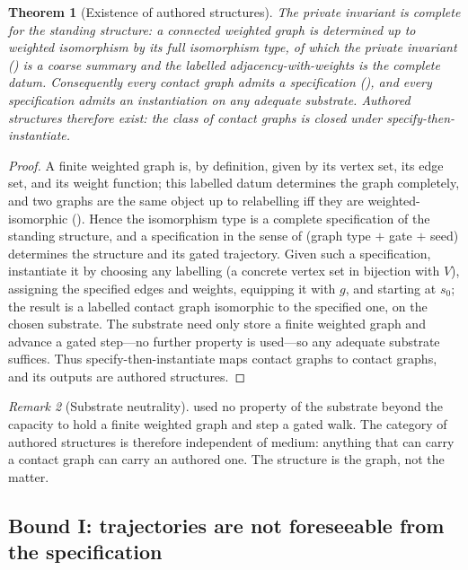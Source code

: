 \documentclass[11pt,a4paper]{article}
\theoremstyle{thmstyle}
\newtheorem{theorem}{Theorem}[section]
\theoremstyle{definition}
\theoremstyle{remark}
\newtheorem{remark}[theorem]{Remark}
\newcommand{\V}{V}                        %
\newcommand{\gate}{g}                     %
\begin{document}
\begin{theorem}[Existence of authored structures]
\label{thm:authored-exist}
The private invariant is complete for the standing structure: a connected
weighted graph is determined up to weighted isomorphism by its full isomorphism
type, of which the private invariant \textup{(}\textup{)} is a
coarse summary and the labelled adjacency-with-weights is the complete datum.
Consequently every contact graph admits a specification
\textup{(}\textup{)}, and every specification admits an
instantiation on any adequate substrate. Authored structures therefore exist:
the class of contact graphs is closed under specify-then-instantiate.
\end{theorem}

\begin{proof}
A finite weighted graph is, by definition, given by its vertex set, its edge
set, and its weight function; this labelled datum determines the graph
completely, and two graphs are the same object up to relabelling iff they are
weighted-isomorphic (). Hence the isomorphism type is a complete
specification of the standing structure, and a specification in the sense of
 (graph type $+$ gate $+$ seed) determines the structure and its
gated trajectory. Given such a specification, instantiate it by choosing any
labelling (a concrete vertex set in bijection with $\V$), assigning the specified
edges and weights, equipping it with $\gate$, and starting at $s_0$; the result
is a labelled contact graph isomorphic to the specified one, on the chosen
substrate. The substrate need only store a finite weighted graph and advance a
gated step---no further property is used---so any adequate substrate suffices.
Thus specify-then-instantiate maps contact graphs to contact graphs, and its
outputs are authored structures.
\end{proof}

\begin{remark}[Substrate neutrality]
\label{rem:substrate}
 used no property of the substrate beyond the capacity
to hold a finite weighted graph and step a gated walk. The category of authored
structures is therefore independent of medium: anything that can carry a contact
graph can carry an authored one. The structure is the graph, not the matter.
\end{remark}

\subsection{Bound I: trajectories are not foreseeable from the specification}
\end{document}

